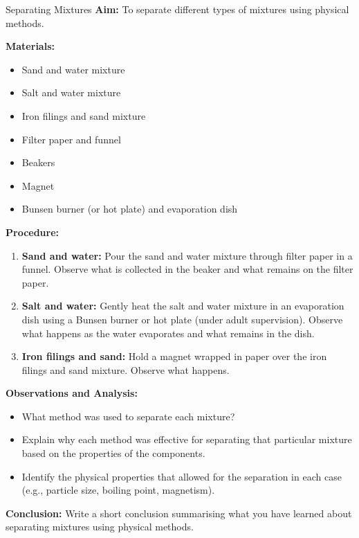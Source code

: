 \begin{investigation}{Separating Mixtures}
\textbf{Aim:} To separate different types of mixtures using physical methods.

\textbf{Materials:}
\begin{itemize}
    \item Sand and water mixture
    \item Salt and water mixture
    \item Iron filings and sand mixture
    \item Filter paper and funnel
    \item Beakers
    \item Magnet
    \item Bunsen burner (or hot plate) and evaporation dish
\end{itemize}

\textbf{Procedure:}
\begin{enumerate}
    \item \textbf{Sand and water:}  Pour the sand and water mixture through filter paper in a funnel. Observe what is collected in the beaker and what remains on the filter paper.
    \item \textbf{Salt and water:} Gently heat the salt and water mixture in an evaporation dish using a Bunsen burner or hot plate (under adult supervision). Observe what happens as the water evaporates and what remains in the dish.
    \item \textbf{Iron filings and sand:}  Hold a magnet wrapped in paper over the iron filings and sand mixture.  Observe what happens.
\end{enumerate}

\textbf{Observations and Analysis:}
\begin{itemize}
    \item What method was used to separate each mixture?
    \item Explain why each method was effective for separating that particular mixture based on the properties of the components.
    \item Identify the physical properties that allowed for the separation in each case (e.g., particle size, boiling point, magnetism).
\end{itemize}

\textbf{Conclusion:}
Write a short conclusion summarising what you have learned about separating mixtures using physical methods.
\end{investigation}

